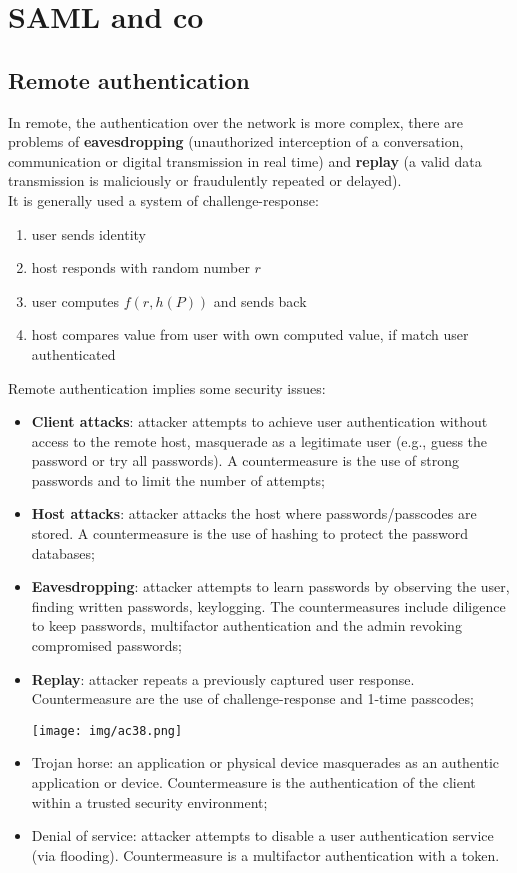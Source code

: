 \documentclass[a4paper, 10pt, titlepage]{article}
\begin{document}
\newpage
\section{SAML and co}
\subsection{Remote authentication}
In remote, the authentication over the network is more complex, there are problems of \textbf{eavesdropping} (unauthorized interception of a conversation, communication or digital transmission in real time) and \textbf{replay} (a valid data transmission is maliciously or fraudulently repeated or delayed). \\
It is generally used a system of challenge-response:
\begin{enumerate}
\item user sends identity
\item host responds with random number $r$
\item user computes $f(r,h(P))$ and sends back
\item host compares value from user with own computed value, if match user authenticated
\end{enumerate}
Remote authentication implies some security issues:
\begin{itemize}
\item \textbf{Client attacks}: attacker attempts to achieve user authentication without access to the remote host, masquerade as a legitimate user (e.g., guess the password or try all passwords). A countermeasure is the use of strong passwords and to limit the number of attempts;
\item \textbf{Host attacks}: attacker attacks the host where passwords/passcodes are stored. A countermeasure is the use of hashing to protect the password databases;
\item \textbf{Eavesdropping}: attacker attempts to learn passwords by observing the user, finding written passwords, keylogging. The countermeasures include diligence to keep passwords, multifactor authentication and the admin revoking compromised passwords;
\item \textbf{Replay}: attacker repeats a previously captured user response. Countermeasure are the use of challenge-response and 1-time passcodes;
\begin{center}
\texttt{[image: img/ac38.png]}
\end{center}
\item Trojan horse: an application or physical device masquerades as an authentic application or device. Countermeasure is the authentication of the client within a trusted security environment;
\item Denial of service: attacker attempts to disable a user authentication service (via flooding). Countermeasure is a multifactor authentication with a token.
\end{itemize}
\end{document}
